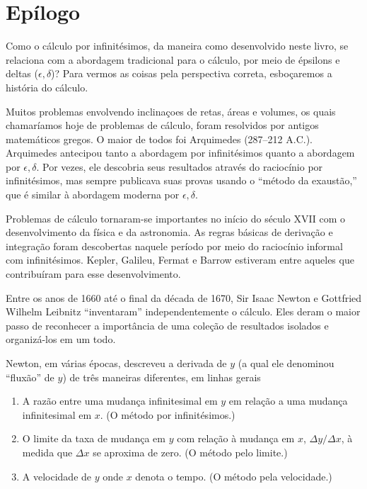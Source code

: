 \documentclass{svmono}
\begin{document}
\chapter*{Epílogo}

Como o cálculo por infinitésimos, da maneira como desenvolvido neste livro,
se relaciona com a abordagem tradicional para o cálculo, por meio de
épsilons e deltas ($\epsilon,\delta$)?
Para vermos as coisas pela perspectiva correta,
esboçaremos a história do cálculo.

Muitos problemas envolvendo inclinaçoes de retas, áreas e volumes, os quais
chamaríamos hoje de problemas de cálculo, foram resolvidos por antigos
matemáticos gregos. O maior de todos foi Arquimedes (287--212 A.C.).
Arquimedes antecipou tanto a abordagem por infinitésimos quanto a
abordagem por $\epsilon,\delta$. Por vezes, ele descobria seus resultados
através do raciocínio por infinitésimos, mas sempre publicava suas provas
usando o ``método da exaustão,'' que é similar à abordagem moderna por
$\epsilon,\delta$.

Problemas de cálculo tornaram-se importantes no início do século
XVII com o desenvolvimento da física e da astronomia. As regras
básicas de derivação e integração foram descobertas naquele período
por meio do raciocínio informal com infinitésimos. Kepler, Galileu,
Fermat e Barrow estiveram entre aqueles que contribuíram para esse
desenvolvimento.

Entre os anos de 1660 até o final da década de 1670, Sir Isaac Newton e
Gottfried Wilhelm Leibnitz ``inventaram'' independentemente o cálculo.
Eles deram o maior passo de reconhecer a importância de uma coleção
de resultados isolados e organizá-los em um todo.

Newton, em várias épocas, descreveu a derivada de $y$ (a qual ele
denominou ``fluxão'' de $y$) de
três maneiras diferentes, em linhas gerais
\begin{enumerate}[(1)]
\item A razão entre uma mudança infinitesimal em $y$ em relação a
      uma mudança infinitesimal em $x$. (O método por infinitésimos.)
\item O limite da taxa de mudança em $y$ com relação à mudança em $x$,
      $\Delta y / \Delta x$, à medida que $\Delta x$ se aproxima de
      zero. (O método pelo limite.)
\item A velocidade de $y$ onde $x$ denota o tempo. (O método pela
      velocidade.)
\end{enumerate}
\end{document}
